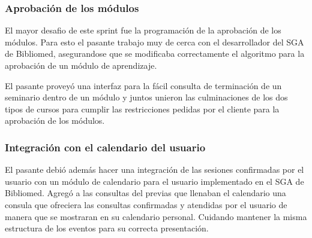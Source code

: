 \subsubsection{Aprobación de los módulos}

El mayor desafio de este sprint fue la programación de la aprobación de los módulos. Para esto el pasante trabajo muy de cerca con el desarrollador del SGA de Bibliomed, asegurandose que se modificaba correctamente el algoritmo para la aprobación de un módulo de aprendizaje.

El pasante proveyó una interfaz para la fácil consulta de terminación de un seminario dentro de un módulo y juntos unieron las culminaciones de los dos tipos de cursos para cumplir las restricciones pedidas por el cliente para la aprobación de los módulos.

\subsubsection{Integración con el calendario del usuario}

El pasante debió además hacer una integración de las sesiones confirmadas por el usuario con un módulo de calendario para el usuario implementado en el SGA de Bibliomed. Agregó a las consultas del previas que llenaban el calendario una consula que ofreciera las consultas confirmadas y atendidas por el usuario de manera que se mostraran en su calendario personal. Cuidando mantener la misma estructura de los eventos para su correcta presentación.

